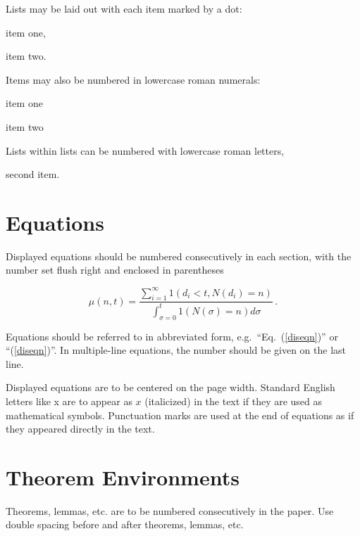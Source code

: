 \documentclass{ws-ijitdm}
\begin{document}
Lists may be laid out with each item marked by a dot:
\begin{itemlist}
 \item item one,
 \item item two.
\end{itemlist}
Items may also be numbered in lowercase roman numerals:
\begin{romanlist}[(ii)]
\item item one
\item item two 
\begin{romanlist}[(b)]
\item Lists within lists can be numbered with lowercase roman letters,
\item second item. 
\end{romanlist}
\end{romanlist}

\section{Equations}

Displayed equations should be numbered consecutively in each
section, with the number set flush right and enclosed in
parentheses

\renewcommand{\theequation}{\thesection.\arabic{equation}}
\setcounter{equation}{0}
\begin{equation}
\mu(n, t) = \frac{\sum^\infty_{i=1} 1(d_i < t, N(d_i) = n)}{
\int^t_{\sigma=0} 1(N(\sigma) = n)d\sigma}\,.
\label{diseqn}
\end{equation}

Equations should be referred to in abbreviated form,
e.g.~``Eq.~(\ref{diseqn})'' or ``(\ref{diseqn})''. In multiple-line
equations, the number should be given on the last line.

Displayed equations are to be centered on the page width.
Standard English letters like x are to appear as $x$
(italicized) in the text if they are used as mathematical
symbols. Punctuation marks are used at the end of equations as
if they appeared directly in the text.

\section{Theorem Environments}

\begin{theorem}
Theorems, lemmas, etc. are to be numbered
consecutively in the paper. Use double spacing before and after
theorems, lemmas, etc.
\end{theorem}
\end{document}
